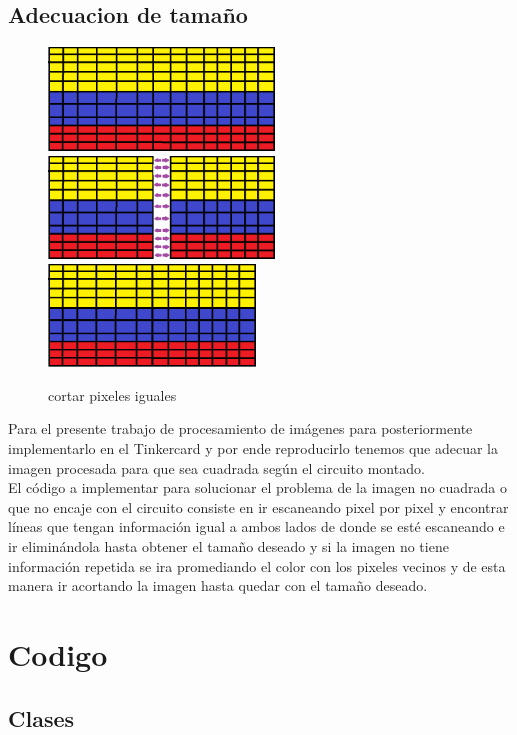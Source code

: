 \documentclass{article}
\begin{document}
\subsection{Adecuacion de tamaño }
\begin{figure}[h]
\includegraphics[width=6cm]{bandera_pixel.png}
\includegraphics[width=6cm]{eliminar_pixel.png}
\includegraphics[width=5.5cm]{acomodar.png}
\centering
\caption{cortar pixeles iguales}
\label{fig:matriz de leds}
\end{figure}
Para el presente trabajo de procesamiento de imágenes para posteriormente implementarlo en el Tinkercard y por ende reproducirlo tenemos que adecuar la imagen procesada para que sea cuadrada según el circuito montado.\\
El código a implementar para solucionar el problema de la imagen no cuadrada o que no encaje con el circuito consiste en  ir escaneando pixel por pixel y encontrar  líneas que tengan información igual a ambos lados de donde se esté escaneando  e ir eliminándola hasta obtener el tamaño deseado y si la imagen no tiene información repetida se ira promediando el color con los pixeles vecinos y de esta manera ir acortando la imagen hasta quedar con el tamaño deseado.

\newpage 

\section{Codigo}
\subsection{Clases}
\end{document}

